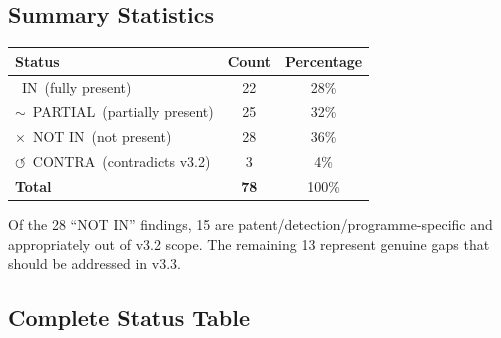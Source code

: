 \documentclass[11pt,a4paper]{article}
\newcommand{\vin}{\textcolor{statusIN}{\checkmark~IN}}
\newcommand{\vpartial}{\textcolor{statusPARTIAL}{$\sim$~PARTIAL}}
\newcommand{\vnot}{\textcolor{statusNOT}{$\times$~NOT IN}}
\newcommand{\vcontra}{\textcolor{statusCONTRA}{$\circlearrowleft$~CONTRA}}
\begin{document}
\subsection{Summary Statistics}

\begin{center}
\begin{tabular}{lcc}
\toprule
\textbf{Status} & \textbf{Count} & \textbf{Percentage} \\
\midrule
\vin\ (fully present) & 22 & 28\% \\
\vpartial\ (partially present) & 25 & 32\% \\
\vnot\ (not present) & 28 & 36\% \\
\vcontra\ (contradicts v3.2) & 3 & 4\% \\
\midrule
\textbf{Total} & \textbf{78} & 100\% \\
\bottomrule
\end{tabular}
\end{center}

\noindent Of the 28 ``NOT IN'' findings, 15 are patent/detection/programme-specific and appropriately out of v3.2 scope. The remaining 13 represent genuine gaps that should be addressed in v3.3.

\subsection{Complete Status Table}
\end{document}
